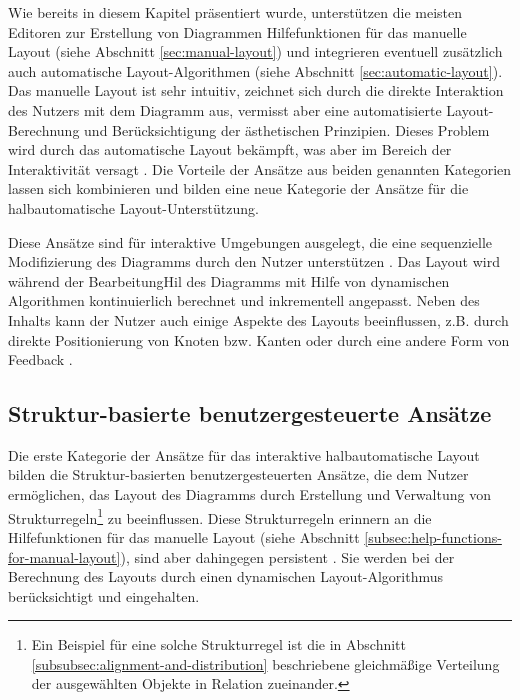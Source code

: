Wie bereits in diesem Kapitel präsentiert wurde, unterstützen die meisten Editoren zur Erstellung von Diagrammen Hilfefunktionen für das manuelle Layout (siehe Abschnitt \ref{sec:manual-layout}) und integrieren eventuell zusätzlich auch automatische Layout-Algorithmen (siehe Abschnitt \ref{sec:automatic-layout}). Das manuelle Layout ist sehr intuitiv, zeichnet sich durch die direkte Interaktion des Nutzers mit dem Diagramm aus, vermisst aber eine automatisierte Layout-Berechnung und Berücksichtigung der ästhetischen Prinzipien. Dieses Problem wird durch das automatische Layout bekämpft, was aber im Bereich der Interaktivität versagt \cite{GladischSchumann14Semi-Automatic}. Die Vorteile der Ansätze aus beiden genannten Kategorien lassen sich kombinieren und bilden eine neue Kategorie der Ansätze für die halbautomatische Layout-Unterstützung.

Diese Ansätze sind für interaktive Umgebungen ausgelegt, die eine sequenzielle Modifizierung des Diagramms durch den Nutzer unterstützen \cite{Arvo02Techniques, GladischSchumann14Semi-Automatic, Wybrow08Using}. Das Layout wird während der BearbeitungHil des Diagramms mit Hilfe von dynamischen Algorithmen kontinuierlich berechnet und inkrementell angepasst. Neben des Inhalts kann der Nutzer auch einige Aspekte des Layouts beeinflussen, z.B. durch direkte Positionierung von Knoten bzw. Kanten oder durch eine andere Form von Feedback \cite{Arvo02Techniques}.

\subsection{Struktur-basierte benutzergesteuerte Ansätze}
\label{subsec:structure-based-user-controlled-approaches}

Die erste Kategorie der Ansätze für das interaktive halbautomatische Layout bilden die Struktur-basierten benutzergesteuerten Ansätze, die dem Nutzer ermöglichen, das Layout des Diagramms durch Erstellung und Verwaltung von Strukturregeln\footnote{Ein Beispiel für eine solche Strukturregel ist die in Abschnitt \ref{subsubsec:alignment-and-distribution} beschriebene gleichmäßige Verteilung der ausgewählten Objekte in Relation zueinander.} zu beeinflussen. Diese Strukturregeln erinnern an die Hilfefunktionen für das manuelle Layout (siehe Abschnitt \ref{subsec:help-functions-for-manual-layout}), sind aber dahingegen persistent \cite{Wybrow08Using}. Sie werden bei der Berechnung des Layouts durch einen dynamischen Layout-Algorithmus berücksichtigt und eingehalten.

